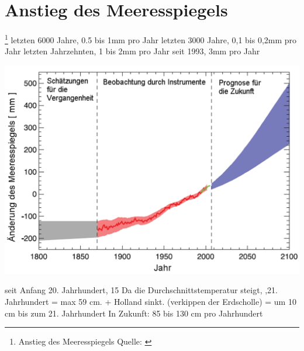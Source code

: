 \section{Anstieg des Meeresspiegels}\footnote{Anstieg des Meeresspiegels Quelle: \cite{meeresspiegel} \cite{meeresspiegel2}} 
letzten 6000 Jahre, 0.5 bis 1mm pro Jahr
\newline
letzten 3000 Jahre,  0,1 bis 0,2mm pro Jahr
\newline
letzten Jahrzehnten, 1 bis 2mm pro Jahr
\newline
seit 1993, 3mm pro Jahr
\newline

\includegraphics[width=1\textwidth]{images/anstieg.jpg}
\newline\newline


seit Anfang 20. Jahrhundert, 15
\newline
Da die Durchschnittstemperatur steigt, ,21. Jahrhundert = max 59 cm. 
+ Holland sinkt. (verkippen der Erdscholle) = um 10 cm bis zum 21. Jahrhundert
\newline
In Zukunft:  85 bis 130 cm pro Jahrhundert